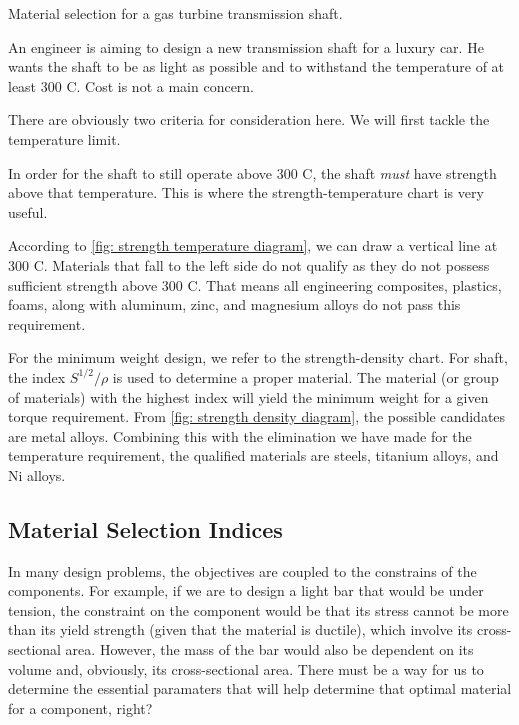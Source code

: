 \documentclass[
10pt,
a4paper,
openany,
svgnames,
]{book}
\begin{document}
\begin{example} Material selection for a gas turbine transmission shaft.

  An engineer is aiming to design a new transmission shaft for a luxury car. He wants the shaft to be as light as possible and to withstand the temperature of at least 300 C. Cost is not a main concern.

\end{example}
\begin{solution}
  There are obviously two criteria for consideration here. We will first tackle the temperature limit.

  In order for the shaft to still operate above 300 C, the shaft \emph{must} have strength above that temperature. This is where the strength-temperature chart is very useful.

  According to \cref{fig: strength temperature diagram}, we can draw a vertical line at 300 C. Materials that fall to the left side do not qualify as they do not possess sufficient strength above 300 C. That means all engineering composites, plastics, foams, along with aluminum, zinc, and magnesium alloys do not pass this requirement.

  For the minimum weight design, we refer to the strength-density chart. For shaft, the index $S^{1/2}/\rho$ is used to determine a proper material. The material (or group of materials) with the highest index will yield the minimum weight for a given torque requirement. From \cref{fig: strength density diagram}, the possible candidates are metal alloys. Combining this with the elimination we have made for the temperature requirement, the qualified materials are steels, titanium alloys, and Ni alloys. 

\end{solution}

\subsection{Material Selection Indices}

In many design problems, the objectives are coupled to the constrains of the components. For example, if we are to design a light bar that would be under tension, the constraint on the component would be that its stress cannot be more than its yield strength (given that the material is ductile), which involve its cross-sectional area. However, the mass of the bar would also be dependent on its volume and, obviously, its cross-sectional area. There must be a way for us to determine the essential paramaters that will help determine that optimal material for a component, right?
\end{document}
